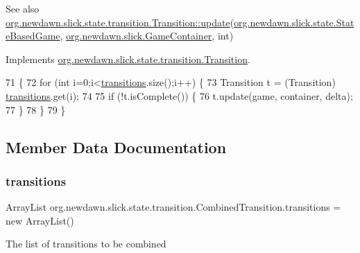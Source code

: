\begin{DoxySeeAlso}{See also}
\mbox{\hyperlink{interfaceorg_1_1newdawn_1_1slick_1_1state_1_1transition_1_1_transition_a9be3072f6e2423e3d0a451a419d1d518}{org.\+newdawn.\+slick.\+state.\+transition.\+Transition\+::update}}(\mbox{\hyperlink{classorg_1_1newdawn_1_1slick_1_1state_1_1_state_based_game}{org.\+newdawn.\+slick.\+state.\+State\+Based\+Game}}, \mbox{\hyperlink{classorg_1_1newdawn_1_1slick_1_1_game_container}{org.\+newdawn.\+slick.\+Game\+Container}}, int) 
\end{DoxySeeAlso}


Implements \mbox{\hyperlink{interfaceorg_1_1newdawn_1_1slick_1_1state_1_1transition_1_1_transition_a9be3072f6e2423e3d0a451a419d1d518}{org.\+newdawn.\+slick.\+state.\+transition.\+Transition}}.


\begin{DoxyCode}
71                                                                                                       \{
72         \textcolor{keywordflow}{for} (\textcolor{keywordtype}{int} i=0;i<\mbox{\hyperlink{classorg_1_1newdawn_1_1slick_1_1state_1_1transition_1_1_combined_transition_a4fea111ea283a26351cb164e389ebbbf}{transitions}}.size();i++) \{
73             Transition t = (Transition) \mbox{\hyperlink{classorg_1_1newdawn_1_1slick_1_1state_1_1transition_1_1_combined_transition_a4fea111ea283a26351cb164e389ebbbf}{transitions}}.get(i);
74             
75             \textcolor{keywordflow}{if} (!t.isComplete()) \{
76                 t.update(game, container, delta);
77             \}
78         \}
79     \}
\end{DoxyCode}


\subsection{Member Data Documentation}
\mbox{\label{classorg_1_1newdawn_1_1slick_1_1state_1_1transition_1_1_combined_transition_a4fea111ea283a26351cb164e389ebbbf}} 
\subsubsection{\texorpdfstring{transitions}{transitions}}
{\footnotesize\ttfamily Array\+List org.\+newdawn.\+slick.\+state.\+transition.\+Combined\+Transition.\+transitions = new Array\+List()\hspace{0.3cm}{\ttfamily [private]}}

The list of transitions to be combined 